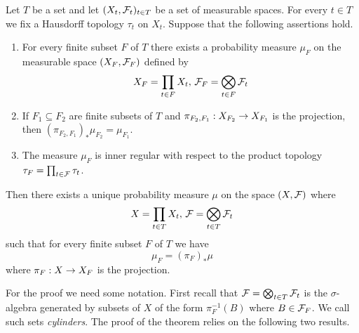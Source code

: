 \begin{theorem}\label{theorem:Daniell_Kolmogorov_extension}
Let $T$ be a set and let $(X_t,{\mathcal F}_t)_{t\in T}$ be a set of measurable spaces. For every $t\in T$ we fix a Hausdorff topology $\tau_t$ on $X_t$. Suppose that the following assertions hold.
\begin{enumerate}[label=\emph{\textbf{(\arabic*)}}, leftmargin=*]
\item For every finite subset $F$ of $T$ there exists a probability measure $\mu_F$ on the measurable space $(X_F,{\mathcal F}_F)$ defined by
$$X_F = \prod_{t\in F}X_t,\,{\mathcal F}_F = \bigotimes_{t\in F}{\mathcal F}_t$$
\item If $F_1\subseteq F_2$ are finite subsets of $T$ and $\pi_{F_2,F_1}:X_{F_2}\rightarrow X_{F_1}$ is the projection, then $\left(\pi_{F_2,F_1}\right)_*\mu_{F_2} = \mu_{F_1}$.
\item The measure $\mu_F$ is inner regular with respect to the product topology $\tau_F = \prod_{t\in {\mathcal F}}\tau_t$.
\end{enumerate}
Then there exists a unique probability measure $\mu$ on the space $(X,{\mathcal F})$ where 
$$X = \prod_{t\in T}X_t,\,{\mathcal F} = \bigotimes_{t\in T}{\mathcal F}_t$$
such that for every finite subset $F$ of $T$ we have
$$\mu_F = \left(\pi_F\right)_*\mu$$
where $\pi_F:X\rightarrow X_F$ is the projection.
\end{theorem}
\noindent
For the proof we need some notation. First recall that ${\mathcal F} = \bigotimes_{t\in T}{\mathcal F}_t$ is the $\sigma$-algebra generated by subsets of $X$ of the form $\pi_F^{-1}(B)$ where $B\in {\mathcal F}_F$. We call such sets \textit{cylinders}. The proof of the theorem relies on the following two results.

